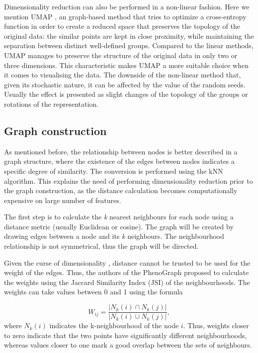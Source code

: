     Dimensionality reduction can also be performed in a non-linear fashion. Here we mention UMAP \cite{mcinnes2018uniform}, an graph-based method that tries to optimize a cross-entropy function in order to create a reduced space that preserves the topology of the original data: the similar points are kept in close proximity, while maintaining the separation between distinct well-defined groups. Compared to the linear methods, UMAP manages to preserve the structure of the original data in only two or three dimensions. This characteristic makes UMAP a more suitable choice when it comes to visualising the data. The downside of the non-linear method that, given its stochastic nature, it can be affected by the value of the random seeds. Usually the effect is presented as slight changes of the topology of the groups or rotations of the representation.

    \subsection{Graph construction}
    As mentioned before, the relationship between nodes is better described in a graph structure, where the existence of the edges between nodes indicates a specific degree of similarity. The conversion is performed using the kNN algorithm. This explains the need of performing dimensionality reduction prior to the graph construction, as the distance calculation becomes computationally expensive on large number of features.
    
    The first step is to calculate the \textit{k} nearest neighbours for each node using a distance metric (usually Euclidean or cosine). The graph will be created by drawing edges between a node and its \textit{k} neighbours. The neighbourhood relationship is not symmetrical, thus the graph will be directed. 
    
    Given the curse of dimensionality \cite{Altman2018}, distance cannot be trusted to be used for the weight of the edges. Thus, the authors of the PhenoGraph proposed to calculate the weights using the Jaccard Similarity Index (JSI) of the neighbourhoods. The weights can take values between 0 and 1 using the formula 
    
    \[ W_{ij} = \frac{|N_k(i) \cap N_k(j)|}{|N_k(i) \cup N_k(j)|}, \] where $N_k(i)$ indicates the k-neighbourhood of the node $i$. Thus, weights closer to zero indicate that the two points have significantly different neighbourhoods, whereas values closer to one mark a good overlap between the sets of neighbours.


